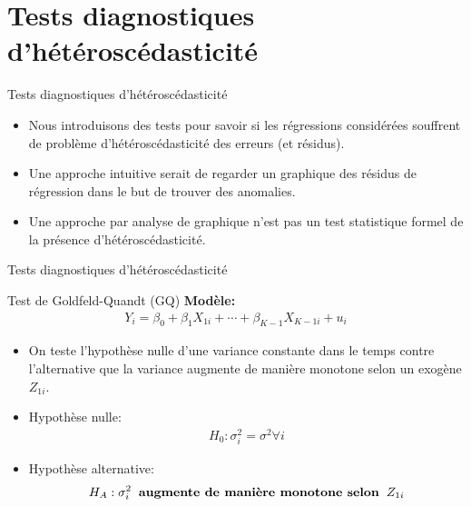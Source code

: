 \documentclass{beamer}
\begin{document}
\section{Tests diagnostiques d'hétéroscédasticité}

\frame{\tableofcontents[current]}


\begin{frame}{Tests diagnostiques d'hétéroscédasticité}
\begin{itemize}
\item Nous introduisons des tests pour savoir si les régressions considérées souffrent de problème d’hétéroscédasticité des erreurs (et résidus). 
\item Une approche intuitive serait de regarder un graphique des résidus de régression dans le but de trouver des anomalies.
\item Une approche par analyse de graphique n’est pas un test statistique formel de la présence d’hétéroscédasticité.
\end{itemize}
\end{frame}

\begin{frame}{Tests diagnostiques d'hétéroscédasticité}
\begin{block}{Test de Goldfeld-Quandt (GQ)}
\textbf{Modèle:}
\begin{align*}
Y_i=\beta_0+\beta_1 X_{1i}+\cdots+\beta_{K-1}X_{K-1i}+u_i
\end{align*}
\begin{itemize}
\item On teste l’hypothèse nulle d’une variance constante dans le temps contre l’alternative que la variance augmente de manière monotone selon un exogène $Z_{1i}$.
\item Hypothèse nulle:
\begin{align*}
H_0: \sigma_i^2 = \sigma^2 \forall i
\end{align*}
\item Hypothèse alternative:
\begin{align*}
H_A: \sigma_i^2 \hspace{0.2cm} \textbf{augmente de manière monotone selon} \hspace{0.2cm} Z_{1i}
\end{align*}
\end{itemize}
\end{block}
\end{frame}
\end{document}
